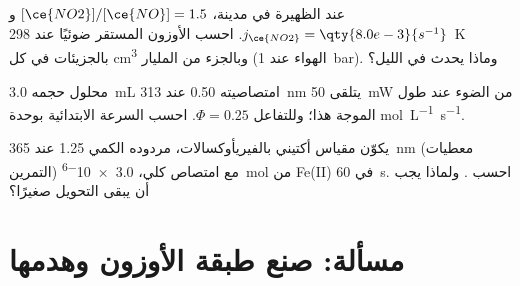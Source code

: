 \begin{exercise}[$\star\star\star$]\label{exo:b3:photochemistry:10}
عند الظهيرة في مدينة، $[\ce{NO2}]/[\ce{NO}] = 1.5$ و$j_{\ce{NO2}} = \qty{8.0e-3}{s^{-1}}$. احسب
الأوزون المستقر ضوئيًا عند \qty{298}{K} بالجزيئات في كل \unit{cm^3} وبالجزء من المليار (الهواء عند \qty{1}{bar}).
وماذا يحدث في الليل؟
\end{exercise}

\begin{exercise}[$\star\star\star$]\label{exo:b3:photochemistry:11}
محلول حجمه \qty{3.0}{mL} امتصاصيته 0.50 عند \qty{313}{nm} يتلقى \qty{50}{mW} من
الضوء عند طول الموجة هذا؛ وللتفاعل $\Phi = 0.25$. احسب السرعة الابتدائية بوحدة
\unit{mol.L^{-1}.s^{-1}}.
\end{exercise}

\begin{exercise}[$\star\star\star$]\label{exo:b3:photochemistry:12}
يكوّن مقياس أكتيني بالفيريأوكسالات، مردوده الكمي 1.25 عند \qty{365}{nm} (معطيات
التمرين) مع امتصاص كلي، \qty{3.0e-6}{mol} من Fe(II) في \qty{60}{s}.
احسب . ولماذا يجب أن يبقى التحويل صغيرًا؟
\end{exercise}

\section{مسألة: صنع طبقة الأوزون وهدمها}

